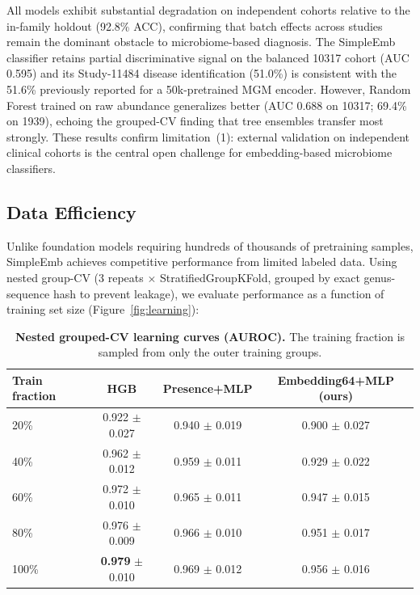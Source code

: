 \documentclass[11pt,a4paper]{article}
\begin{document}
All models exhibit substantial degradation on independent cohorts relative to the in-family holdout (92.8\% ACC), confirming that batch effects across studies remain the dominant obstacle to microbiome-based diagnosis. The SimpleEmb classifier retains partial discriminative signal on the balanced 10317 cohort (AUC 0.595) and its Study-11484 disease identification (51.0\%) is consistent with the 51.6\% previously reported for a 50k-pretrained MGM encoder. However, Random Forest trained on raw abundance generalizes better (AUC 0.688 on 10317; 69.4\% on 1939), echoing the grouped-CV finding that tree ensembles transfer most strongly. These results confirm limitation~(1): external validation on independent clinical cohorts is the central open challenge for embedding-based microbiome classifiers.

\subsection{Data Efficiency}

Unlike foundation models requiring hundreds of thousands of pretraining samples, SimpleEmb achieves competitive performance from limited labeled data. Using nested group-CV (3 repeats $\times$ StratifiedGroupKFold, grouped by exact genus-sequence hash to prevent leakage), we evaluate performance as a function of training set size (Figure~\ref{fig:learning}):

\begin{table}[ht]
\centering
\caption{\textbf{Nested grouped-CV learning curves (AUROC).}
The training fraction is sampled from only the outer training groups.}
\label{tab:learning}
\begin{tabular}{lccc}
\toprule
\textbf{Train fraction} & \textbf{HGB} & \textbf{Presence+MLP} & \textbf{Embedding64+MLP (ours)} \\
\midrule
20\% & 0.922 $\pm$ 0.027 & 0.940 $\pm$ 0.019 & 0.900 $\pm$ 0.027 \\
40\% & 0.962 $\pm$ 0.012 & 0.959 $\pm$ 0.011 & 0.929 $\pm$ 0.022 \\
60\% & 0.972 $\pm$ 0.010 & 0.965 $\pm$ 0.011 & 0.947 $\pm$ 0.015 \\
80\% & 0.976 $\pm$ 0.009 & 0.966 $\pm$ 0.010 & 0.951 $\pm$ 0.017 \\
100\% & \textbf{0.979} $\pm$ 0.010 & 0.969 $\pm$ 0.012 & 0.956 $\pm$ 0.016 \\
\bottomrule
\end{tabular}
\end{table}
\end{document}
